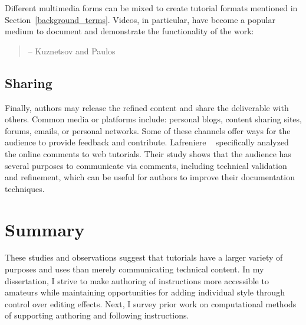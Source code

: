 Different multimedia forms can be mixed to create tutorial formats mentioned in Section~\ref{background_terms}. Videos, in particular, have become a popular medium to document and demonstrate the functionality of the work:

\begin{quote}
 -- Kuznetsov and Paulos~\cite{Kuznetsov:2010:REA:1868914.1868950}
\end{quote}

\subsection{Sharing}
Finally, authors may release the refined content and share the deliverable with others. Common media or platforms include: personal blogs, content sharing sites, forums, emails, or personal networks.
%
Some of these channels offer ways for the audience to provide feedback and contribute. Lafreniere \ea{}~\cite{Lafreniere:2012tl} specifically analyzed the online comments to web tutorials. Their study shows that the audience has several purposes to communicate via comments, including technical validation and refinement, which can be useful for authors to improve their documentation techniques.



\section{Summary}

These studies and observations suggest that tutorials have a larger variety of purposes and uses than merely communicating technical content.
%
In my dissertation, I strive to make authoring of instructions more accessible to amateurs while maintaining opportunities for adding individual style through control over editing effects.
%
Next, I survey prior work on computational methods of supporting authoring and following instructions.
